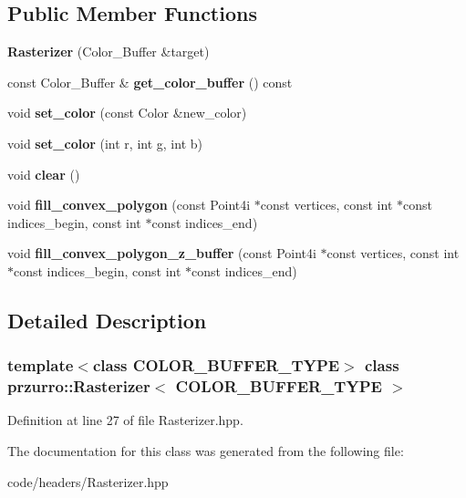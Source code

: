\subsection*{Public Member Functions}
\begin{DoxyCompactItemize}
\item 
\mbox{\label{classprzurro_1_1_rasterizer_afe448c6ffd50bab591e4b42737945560}} 
{\bfseries Rasterizer} (Color\+\_\+\+Buffer \&target)
\item 
\mbox{\label{classprzurro_1_1_rasterizer_a6c833be88c377495d9d7be61e473135f}} 
const Color\+\_\+\+Buffer \& {\bfseries get\+\_\+color\+\_\+buffer} () const
\item 
\mbox{\label{classprzurro_1_1_rasterizer_ad4940acae3d2f9081a197a5ecc21d092}} 
void {\bfseries set\+\_\+color} (const Color \&new\+\_\+color)
\item 
\mbox{\label{classprzurro_1_1_rasterizer_a60baa9f361802b6fcc2094e0fa4eb637}} 
void {\bfseries set\+\_\+color} (int r, int g, int b)
\item 
\mbox{\label{classprzurro_1_1_rasterizer_ac8afb51e3909c102a4b7eda59acfe1ca}} 
void {\bfseries clear} ()
\item 
\mbox{\label{classprzurro_1_1_rasterizer_ae8cd86a34f27f1bed70439ba211ae4da}} 
void {\bfseries fill\+\_\+convex\+\_\+polygon} (const Point4i $\ast$const vertices, const int $\ast$const indices\+\_\+begin, const int $\ast$const indices\+\_\+end)
\item 
\mbox{\label{classprzurro_1_1_rasterizer_af02ff806da8acc6539e818e55c1e44e8}} 
void {\bfseries fill\+\_\+convex\+\_\+polygon\+\_\+z\+\_\+buffer} (const Point4i $\ast$const vertices, const int $\ast$const indices\+\_\+begin, const int $\ast$const indices\+\_\+end)
\end{DoxyCompactItemize}


\subsection{Detailed Description}
\subsubsection*{template$<$class C\+O\+L\+O\+R\+\_\+\+B\+U\+F\+F\+E\+R\+\_\+\+T\+Y\+PE$>$\newline
class przurro\+::\+Rasterizer$<$ C\+O\+L\+O\+R\+\_\+\+B\+U\+F\+F\+E\+R\+\_\+\+T\+Y\+P\+E $>$}



Definition at line 27 of file Rasterizer.\+hpp.



The documentation for this class was generated from the following file\+:\begin{DoxyCompactItemize}
\item 
code/headers/Rasterizer.\+hpp\end{DoxyCompactItemize}
